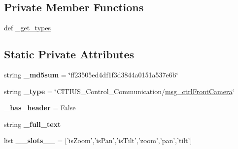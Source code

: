\subsection*{\-Private \-Member \-Functions}
\begin{DoxyCompactItemize}
\item 
def \hyperlink{class_c_i_t_i_u_s___control___communication_1_1msg_1_1__msg__ctrl_front_camera_1_1msg__ctrl_front_camera_acc394ce9b9a7c6a1a5c335f2a23b7d81}{\-\_\-get\-\_\-types}
\end{DoxyCompactItemize}
\subsection*{\-Static \-Private \-Attributes}
\begin{DoxyCompactItemize}
\item 
\hypertarget{class_c_i_t_i_u_s___control___communication_1_1msg_1_1__msg__ctrl_front_camera_1_1msg__ctrl_front_camera_a58237930702a82227ffaf8ab4148e233}{string {\bfseries \-\_\-md5sum} = \char`\"{}ff23505ed4df1f3d3844a0151a537e6b\char`\"{}}\label{class_c_i_t_i_u_s___control___communication_1_1msg_1_1__msg__ctrl_front_camera_1_1msg__ctrl_front_camera_a58237930702a82227ffaf8ab4148e233}

\item 
\hypertarget{class_c_i_t_i_u_s___control___communication_1_1msg_1_1__msg__ctrl_front_camera_1_1msg__ctrl_front_camera_ac95d7bcbcca199d3ae4d26ede760622e}{string {\bfseries \-\_\-type} = \char`\"{}\-C\-I\-T\-I\-U\-S\-\_\-\-Control\-\_\-\-Communication/\hyperlink{class_c_i_t_i_u_s___control___communication_1_1msg_1_1__msg__ctrl_front_camera_1_1msg__ctrl_front_camera}{msg\-\_\-ctrl\-Front\-Camera}\char`\"{}}\label{class_c_i_t_i_u_s___control___communication_1_1msg_1_1__msg__ctrl_front_camera_1_1msg__ctrl_front_camera_ac95d7bcbcca199d3ae4d26ede760622e}

\item 
\hypertarget{class_c_i_t_i_u_s___control___communication_1_1msg_1_1__msg__ctrl_front_camera_1_1msg__ctrl_front_camera_a8e8e3e8d5226c27413b2286310589318}{{\bfseries \-\_\-has\-\_\-header} = \-False}\label{class_c_i_t_i_u_s___control___communication_1_1msg_1_1__msg__ctrl_front_camera_1_1msg__ctrl_front_camera_a8e8e3e8d5226c27413b2286310589318}

\item 
string {\bfseries \-\_\-full\-\_\-text}
\item 
\hypertarget{class_c_i_t_i_u_s___control___communication_1_1msg_1_1__msg__ctrl_front_camera_1_1msg__ctrl_front_camera_a684af88f8e3c87463c2857f855ec6c4e}{list {\bfseries \-\_\-\-\_\-slots\-\_\-\-\_\-} = \mbox{[}'is\-Zoom','is\-Pan','is\-Tilt','zoom','pan','tilt'\mbox{]}}\label{class_c_i_t_i_u_s___control___communication_1_1msg_1_1__msg__ctrl_front_camera_1_1msg__ctrl_front_camera_a684af88f8e3c87463c2857f855ec6c4e}


\end{DoxyCompactItemize}
